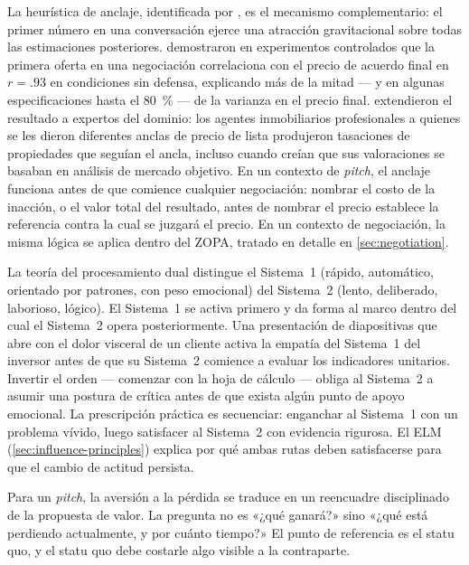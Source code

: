 La heurística de anclaje, identificada por \textcite{tversky1974judgment}, es el mecanismo
complementario: el primer número en una conversación ejerce una atracción gravitacional sobre
todas las estimaciones posteriores. \textcite{galinsky2001anchoring} demostraron en experimentos
controlados que la primera oferta en una negociación correlaciona con el precio de acuerdo final
en $r = .93$ en condiciones sin defensa, explicando más de la mitad --- y en algunas
especificaciones hasta el \qty{80}{\percent} --- de la varianza en el precio final.
\textcite{northcraft1987anchoring} extendieron el resultado a expertos del dominio: los agentes
inmobiliarios profesionales a quienes se les dieron diferentes anclas de precio de lista
produjeron tasaciones de propiedades que seguían el ancla, incluso cuando creían que sus
valoraciones se basaban en análisis de mercado objetivo.
En un contexto de \emph{pitch}, el anclaje funciona antes de que comience cualquier negociación:
nombrar el costo de la inacción, o el valor total del resultado, antes de nombrar el precio
establece la referencia contra la cual se juzgará el precio. En un contexto de negociación, la
misma lógica se aplica dentro del ZOPA, tratado en detalle en \cref{sec:negotiation}.

La teoría del procesamiento dual distingue el Sistema~1 (rápido, automático, orientado por
patrones, con peso emocional) del Sistema~2 (lento, deliberado, laborioso, lógico). El
Sistema~1 se activa primero y da forma al marco dentro del cual el Sistema~2 opera
posteriormente. Una presentación de diapositivas que abre con el dolor visceral de un cliente
activa la empatía del Sistema~1 del inversor antes de que su Sistema~2 comience a evaluar los
indicadores unitarios. Invertir el orden --- comenzar con la hoja de cálculo --- obliga al
Sistema~2 a asumir una postura de crítica antes de que exista algún punto de apoyo emocional.
La prescripción práctica es secuenciar: enganchar al Sistema~1 con un problema vívido, luego
satisfacer al Sistema~2 con evidencia rigurosa. El ELM (\cref{sec:influence-principles})
explica por qué ambas rutas deben satisfacerse para que el cambio de actitud persista.

Para un \emph{pitch}, la aversión a la pérdida se traduce en un reencuadre disciplinado de la
propuesta de valor. La pregunta no es «¿qué ganará?» sino «¿qué está perdiendo actualmente,
y por cuánto tiempo?» El punto de referencia es el statu quo, y el statu quo debe costarle
algo visible a la contraparte.

